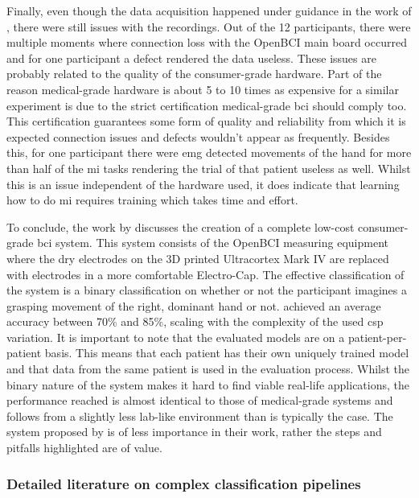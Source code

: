 Finally, even though the data acquisition happened under guidance in the work of \citet{cheap_bci_feasibility}, there were still issues with the recordings.
Out of the 12 participants, there were multiple moments where connection loss with the OpenBCI main board occurred and for one participant a defect rendered the data useless.
These issues are probably related to the quality of the consumer-grade hardware.
Part of the reason medical-grade hardware is about 5 to 10 times as expensive for a similar experiment is due to the strict certification medical-grade \gls{bci} should comply too.
This certification guarantees some form of quality and reliability from which it is expected connection issues and defects wouldn't appear as frequently.
Besides this, for one participant there were \gls{emg} detected movements of the hand for more than half of the \gls{mi} tasks rendering the trial of that patient useless as well.
Whilst this is an issue independent of the hardware used, it does indicate that learning how to do \gls{mi} requires training which takes time and effort.

To conclude, the work by  discusses the creation of a complete low-cost consumer-grade \gls{bci} system.
This system consists of the OpenBCI measuring equipment where the dry electrodes on the 3D printed Ultracortex Mark IV are replaced with electrodes in a more comfortable Electro-Cap.
The effective classification of the system is a binary  classification on whether or not the participant imagines a grasping movement of the right, dominant hand or not.
 achieved an average accuracy between 70\% and 85\%, scaling with the complexity of the used \gls{csp} variation.
It is important to note that the evaluated models are on a patient-per-patient basis.
This means that each patient has their own uniquely trained model and that data from the same patient is used in the evaluation process.
Whilst the binary nature of the system makes it hard to find viable real-life applications, the performance reached is almost identical to those of medical-grade systems and follows from a slightly less lab-like environment than is typically the case.
The system proposed by  is of less importance in their work, rather the steps and pitfalls highlighted are of value.



\subsubsection{Detailed literature on complex classification pipelines}
\label{subsubsec:bci_opportunities_obstacles_motivating_examples_mi_models}

